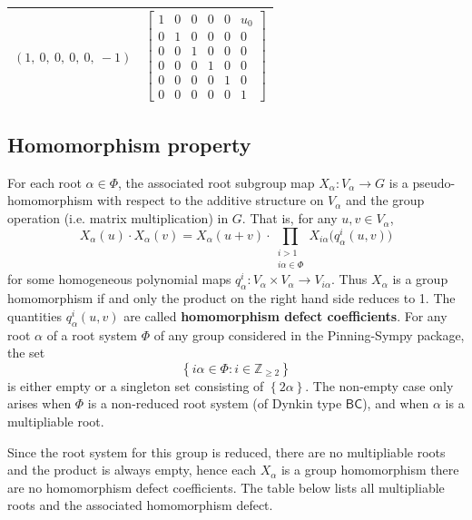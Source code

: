 \documentclass[11pt]{article}
\newcommand{\noi}{\noindent}
\newcommand{\tbf}{\textbf}
\newcommand{\lb}{\left\{}
\newcommand{\rb}{\right\}}
\newcommand{\Z}{\mathbb{Z}}
\theoremstyle{definition}
\newif\ifrootsystemreduced
\begin{document}
\begin{longtable}{|l|c|}
    \hline
    $\left( 1, \  0, \  0, \  0, \  0, \  -1\right)$ & ${\left[\begin{matrix}1 & 0 & 0 & 0 & 0 & u_{0}\\0 & 1 & 0 & 0 & 0 & 0\\0 & 0 & 1 & 0 & 0 & 0\\0 & 0 & 0 & 1 & 0 & 0\\0 & 0 & 0 & 0 & 1 & 0\\0 & 0 & 0 & 0 & 0 & 1\end{matrix}\right]}$ \\
    \hline
\end{longtable}


\subsection{Homomorphism property}

\noi For each root $\alpha \in \Phi$, the associated root subgroup map $X_\alpha:V_\alpha \to G$ is a pseudo-homomorphism with respect to the additive structure on $V_\alpha$ and the group operation (i.e. matrix multiplication) in $G$. That is, for any $u,v \in V_\alpha$,
\begin{equation}
\label{pseudo homomorphism}
	X_\alpha(u) \cdot X_\alpha(v) = X_\alpha(u+v) \cdot \prod_{\substack{i > 1 \\ i \alpha \in \Phi}} X_{i \alpha} \Big( q^i_\alpha(u,v) \Big)
\end{equation}
for some homogeneous polynomial maps $q^i_\alpha:V_\alpha \times V_\alpha \to V_{i \alpha}$. Thus $X_\alpha$ is a group homomorphism if and only the product on the right hand side reduces to 1. The quantities $q^i_\alpha(u,v)$ are called \tbf{homomorphism defect coefficients}. For any root $\alpha$ of a root system $\Phi$ of any group considered in the Pinning-Sympy package, the set
\[
	\lb i \alpha \in \Phi : i \in \Z_{\ge 2} \rb
\]
is either empty or a singleton set consisting of $\lb 2 \alpha \rb$. The non-empty case only arises when $\Phi$ is a non-reduced root system (of Dynkin type $\mathsf{BC}$), and when $\alpha$ is a multipliable root. 

\ifrootsystemreduced
Since the root system for this group is reduced, there are no multipliable roots and the product is always empty, hence each $X_\alpha$ is a group homomorphism there are no homomorphism defect coefficients.
\else
The table below lists all multipliable roots and the associated homomorphism defect.

\bigskip
\end{document}
